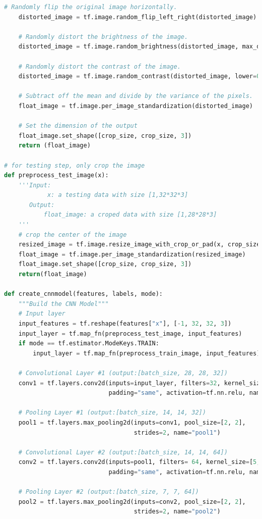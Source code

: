 \documentclass[hyperref]{article}
\theoremstyle{nonumberplain}
\begin{document}
\begin{appendices}
\begin{lstlisting}[language=Python]
    # Randomly flip the original image horizontally.
    distorted_image = tf.image.random_flip_left_right(distorted_image)

    # Randomly distort the brightness of the image.
    distorted_image = tf.image.random_brightness(distorted_image, max_delta=1.0)

    # Randomly distort the contrast of the image.
    distorted_image = tf.image.random_contrast(distorted_image, lower=0.2, upper=1.0)

    # Subtract off the mean and divide by the variance of the pixels.
    float_image = tf.image.per_image_standardization(distorted_image)

    # Set the dimension of the output
    float_image.set_shape([crop_size, crop_size, 3])
    return (float_image)

# for testing step, only crop the image
def preprocess_test_image(x):
    '''Input:
            x: a testing data with size [1,32*32*3]
       Output:
           float_image: a croped data with size [1,28*28*3]
    '''
    # crop the center of the image
    resized_image = tf.image.resize_image_with_crop_or_pad(x, crop_size, crop_size)
    float_image = tf.image.per_image_standardization(resized_image)
    float_image.set_shape([crop_size, crop_size, 3])
    return(float_image)

def create_cnnmodel(features, labels, mode):
    """Build the CNN Model"""
    # Input layer
    input_features = tf.reshape(features["x"], [-1, 32, 32, 3])
    input_layer = tf.map_fn(preprocess_test_image, input_features)
    if mode == tf.estimator.ModeKeys.TRAIN:
        input_layer = tf.map_fn(preprocess_train_image, input_features)

    # Convolutional Layer #1 (output:[batch_size, 28, 28, 32])
    conv1 = tf.layers.conv2d(inputs=input_layer, filters=32, kernel_size=[5, 5],
                             padding="same", activation=tf.nn.relu, name="conv1")

    # Pooling Layer #1 (output:[batch_size, 14, 14, 32])
    pool1 = tf.layers.max_pooling2d(inputs=conv1, pool_size=[2, 2],
                                    strides=2, name="pool1")

    # Convolutional Layer #2 (output:[batch_size, 14, 14, 64])
    conv2 = tf.layers.conv2d(inputs=pool1, filters= 64, kernel_size=[5, 5],
                             padding="same", activation=tf.nn.relu, name="conv2")

    # Pooling Layer #2 (output:[batch_size, 7, 7, 64])
    pool2 = tf.layers.max_pooling2d(inputs=conv2, pool_size=[2, 2],
                                    strides=2, name="pool2")


\end{lstlisting}
\end{appendices}
\end{document}
